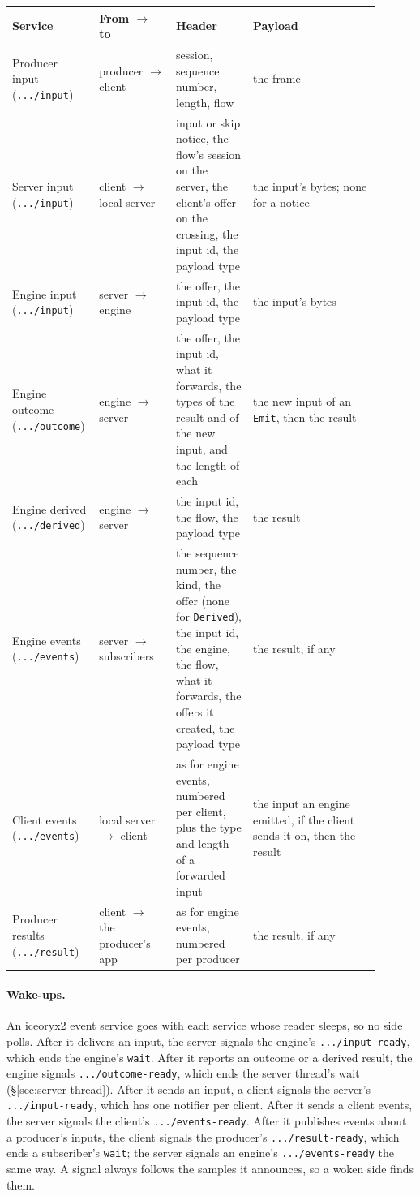\documentclass[11pt]{article}
\newcommand{\code}[1]{\texttt{#1}}
\begin{document}
\begin{center}
\small
\begin{tabular}{@{}p{0.17\linewidth}p{0.2\linewidth}p{0.2\linewidth}p{0.33\linewidth}@{}}
\toprule
Service & From $\to$ to & Header & Payload \\
\midrule
Producer input (\code{.../input})
  & producer $\to$ client
  & session, sequence number, length, flow
  & the frame \\
Server input (\code{.../input})
  & client $\to$ local server
  & input or skip notice, the flow's session on the server, the client's
    offer on the crossing, the input id, the payload type
  & the input's bytes; none for a notice \\
Engine input (\code{.../input})
  & server $\to$ engine
  & the offer, the input id, the payload type
  & the input's bytes \\
Engine outcome (\code{.../outcome})
  & engine $\to$ server
  & the offer, the input id, what it forwards, the types of the result and
    of the new input, and the length of each
  & the new input of an \code{Emit}, then the result \\
Engine derived (\code{.../derived})
  & engine $\to$ server
  & the input id, the flow, the payload type
  & the result \\
Engine events (\code{.../events})
  & server $\to$ subscribers
  & the sequence number, the kind, the offer (none for \code{Derived}), the
    input id, the engine, the flow, what it forwards, the offers it created,
    the payload type
  & the result, if any \\
Client events (\code{.../events})
  & local server $\to$ client
  & as for engine events, numbered per client, plus the type and length of
    a forwarded input
  & the input an engine emitted, if the client sends it on, then the
    result \\
Producer results (\code{.../result})
  & client $\to$ the producer's app
  & as for engine events, numbered per producer
  & the result, if any \\
\bottomrule
\end{tabular}
\end{center}

\paragraph{Wake-ups.} An iceoryx2 event service goes with each service whose
reader sleeps, so no side polls. After it delivers an input, the server
signals the engine's \code{.../input-ready}, which ends the engine's
\code{wait}. After it reports an outcome or a derived result, the engine
signals \code{.../outcome-ready}, which ends the server thread's wait
(\S\ref{sec:server-thread}). After it sends an input, a client signals the
server's \code{.../input-ready}, which has one notifier per client. After it
sends a client events, the server signals the client's
\code{.../events-ready}. After it publishes events about a producer's inputs,
the client signals the producer's \code{.../result-ready}, which ends a
subscriber's \code{wait}; the server signals an engine's
\code{.../events-ready} the same way. A signal always follows the samples it announces, so
a woken side finds them.
\end{document}
